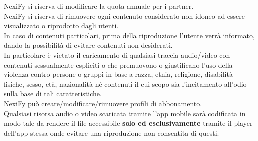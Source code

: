 NexiFy si riserva di modificare la quota annuale per i partner.\\
NexiFy si riserva di rimuovere ogni contenuto considerato non idoneo ad essere visualizzato o riprodotto dagli utenti.\\
In caso di contenuti particolari, prima della riproduzione l'utente verrà informato, dando la possibilità di evitare contenuti non desiderati.\\
In particolare è vietato il caricamento di qualsiasi traccia audio/video con contenuti sessualmente espliciti o che promuovono o giustificano l'uso della violenza contro persone o gruppi in base a razza, etnia, religione, disabilità fisiche, sesso, età, nazionalità né contenuti il cui scopo sia l'incitamento all'odio sulla base di tali caratteristiche. \\
NexiFy può creare/modificare/rimuovere profili di abbonamento. \\
Qualsiasi risorsa audio o video scaricata tramite l'app mobile sarà codificata in modo tale da rendere il file accessibile \textbf{solo ed esclusivamente} tramite il player dell'app stessa onde evitare una riproduzione non consentita di questi.
 

